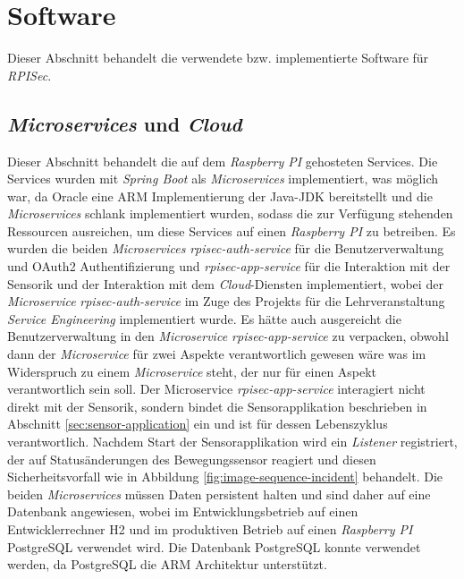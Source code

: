 
\section{Software}
Dieser Abschnitt behandelt die verwendete bzw. implementierte Software für \emph{RPISec}.
\subsection{\emph{Microservices} und \emph{Cloud}}
Dieser Abschnitt behandelt die auf dem \emph{Raspberry PI} gehosteten Services. Die Services wurden mit \emph{Spring Boot} als \emph{Microservices} implementiert, was möglich war, da Oracle eine ARM Implementierung der Java-JDK bereitstellt und die \emph{Microservices} schlank implementiert wurden, sodass die zur Verfügung stehenden Ressourcen ausreichen, um diese Services auf einen \emph{Raspberry PI} zu betreiben.
\newline
\newline
Es wurden die beiden \emph{Microservices} \emph{rpisec-auth-service} für die Benutzerverwaltung und OAuth2 Authentifizierung und \emph{rpisec-app-service} für die Interaktion mit der Sensorik und der Interaktion mit dem \emph{Cloud}-Diensten implementiert, wobei der \emph{Microservice} \emph{rpisec-auth-service} im Zuge des Projekts für die Lehrveranstaltung \emph{Service Engineering} implementiert wurde. Es hätte auch ausgereicht die Benutzerverwaltung in den \emph{Microservice rpisec-app-service} zu verpacken, obwohl dann der \emph{Microservice} für zwei Aspekte verantwortlich gewesen wäre was im Widerspruch zu einem \emph{Microservice} steht, der nur für einen Aspekt verantwortlich sein soll. 
\newline
\newline
Der Microservice \emph{rpisec-app-service} interagiert nicht direkt mit der Sensorik, sondern bindet die Sensorapplikation beschrieben in Abschnitt \ref{sec:sensor-application} ein und ist für dessen Lebenszyklus verantwortlich. Nachdem Start der Sensorapplikation wird ein \emph{Listener} registriert, der auf Statusänderungen des Bewegungssensor reagiert und diesen Sicherheitsvorfall wie in Abbildung \ref{fig:image-sequence-incident} behandelt.
\newline
\newline
Die beiden \emph{Microservices} müssen Daten persistent halten und sind daher auf eine Datenbank angewiesen, wobei im Entwicklungsbetrieb auf einen Entwicklerrechner H2 und im produktiven Betrieb auf einen \emph{Raspberry PI} PostgreSQL verwendet wird. Die Datenbank PostgreSQL konnte verwendet werden, da PostgreSQL die ARM Architektur unterstützt.
